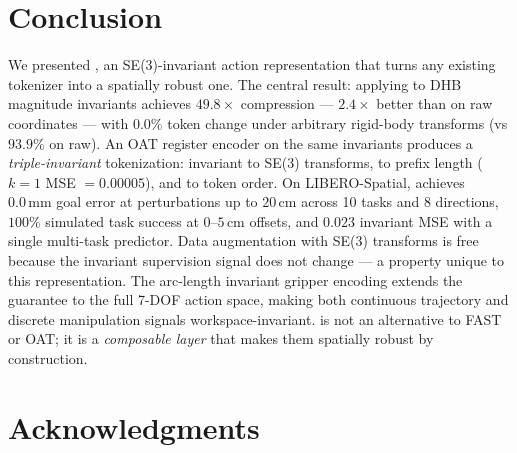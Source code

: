 \section*{Conclusion}

We presented \dhb{}, an SE(3)-invariant action representation that turns
any existing tokenizer into a spatially robust one.
The central result: applying \fast{} to DHB magnitude invariants achieves
$49.8\times$ compression --- $2.4\times$ better than \fast{} on raw coordinates ---
with $\mathbf{0.0\%}$ token change under arbitrary rigid-body transforms
(vs $93.9\%$ on raw).
An OAT register encoder on the same invariants produces a \emph{triple-invariant}
tokenization: invariant to SE(3) transforms, to prefix length ($k{=}1$ MSE $= 0.00005$),
and to token order.
On LIBERO-Spatial, \dhb{} achieves $0.0\,\text{mm}$ goal error at
perturbations up to $20\,\text{cm}$ across 10 tasks and 8 directions,
$100\%$ simulated task success at $0$--$5\,\text{cm}$ offsets,
and $0.023$ invariant MSE with a single multi-task predictor.
Data augmentation with SE(3) transforms is free because the invariant
supervision signal does not change --- a property unique to this representation.
The arc-length invariant gripper encoding extends the guarantee to the full
7-DOF action space, making both continuous trajectory and discrete manipulation
signals workspace-invariant.
\dhb{} is not an alternative to FAST or OAT; it is a \emph{composable layer}
that makes them spatially robust by construction.

\section*{Acknowledgments}
